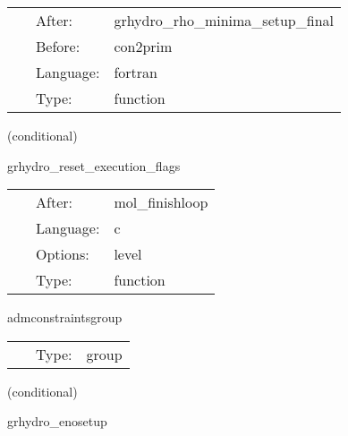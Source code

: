  \begin{tabular*}{160mm}{cll} 
~ & After:  & grhydro\_rho\_minima\_setup\_final \\ 
~ & Before:  & con2prim \\ 
~ & Language:  & fortran \\ 
~ & Type:  & function \\ 
\end{tabular*} 


\vspace{5mm}

   (conditional) 

\hspace{5mm} grhydro\_reset\_execution\_flags 

\hspace{5mm}{\it reset execution flags to 'yeah, execute'! } 


\hspace{5mm}

 \begin{tabular*}{160mm}{cll} 
~ & After:  & mol\_finishloop \\ 
~ & Language:  & c \\ 
~ & Options:  & level \\ 
~ & Type:  & function \\ 
\end{tabular*} 


\vspace{5mm}


\hspace{5mm} admconstraintsgroup 

\hspace{5mm}{\it evaluate adm constraints, and perform symmetry boundary conditions } 


\hspace{5mm}

 \begin{tabular*}{160mm}{cll} 
~ & Type:  & group \\ 
\end{tabular*} 


\vspace{5mm}

   (conditional) 

\hspace{5mm} grhydro\_enosetup 

\hspace{5mm}{\it coefficients for eno reconstruction } 


